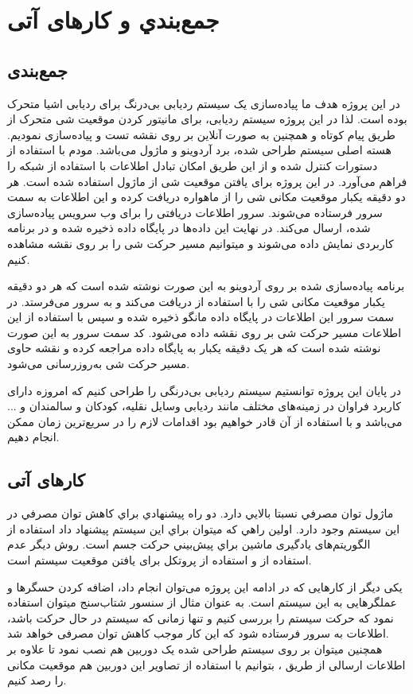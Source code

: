 \chapter{جمع‌بندي و کارهای آتی}
\section{جمع‌بندی}
در این پروژه هدف ما پیاده‌سازی یک سیستم ردیابی بی‌درنگ برای ردیابی اشیا متحرک بوده است.  لذا در این پروژه سیستم ردیابی، برای مانیتور کردن موقعیت شی متحرک از طریق پیام کوتاه و همچنین به صورت آنلاین بر روی نقشه تست و پیاده‌سازی نمودیم. هسته اصلی سیستم طراحی شده، برد آردوینو و ماژول  می‌باشد. مودم  با استفاده از دستورات  کنترل شده و از این طریق امکان تبادل اطلاعات با استفاده از شبکه  را فراهم می‌آورد. در این پروژه برای یافتن موقعیت شی از ماژول  استفاده شده است.  هر دو دقیقه یکبار موقعیت مکانی شی را از ماهواره دریافت کرده و این اطلاعات به سمت سرور فرستاده می‌شوند. سرور اطلاعات دریافتی را برای وب سرویس پیاده‌سازی شده، ارسال می‌کند. در نهایت این داده‌ها در پایگاه داده ذخیره شده و در برنامه کاربردی نمایش داده می‌شوند و میتوانیم مسیر حرکت شی را بر روی نقشه مشاهده کنیم.


برنامه پیاده‌سازی شده بر روی آردوینو به این صورت نوشته شده است که هر دو دقیقه یکبار موقعیت مکانی شی را با استفاده از  دریافت می‌کند و به سرور می‌فرستد. در سمت سرور  این اطلاعات در پایگاه داده مانگو ذخیره شده و سپس با استفاده از این اطلاعات مسیر حرکت شی بر روی نقشه داده می‌شود. کد سمت سرور به این صورت نوشته شده است که هر یک دقیقه یکبار به پایگاه داده مراجعه کرده و نقشه حاوی مسیر حرکت شی به‌روزرسانی می‌شود.


در پایان این پروژه توانستیم سیستم ردیابی بی‌درنگی را  طراحی کنیم که امروزه دارای کاربرد فراوان در زمینه‌های مختلف مانند ردیابی وسایل نقلیه، کودکان و سالمندان و ... می‌باشد و با استفاده از آن قادر خواهیم بود اقدامات لازم را در سریع‌ترین زمان ممکن انجام دهیم.
\section{کارهای آتی}
ماژول  توان مصرفي نسبتا بالايي دارد. دو راه پيشنهادي براي كاهش توان مصرفي در اين سيستم وجود دارد. اولين راهي كه ميتوان براي اين سيستم پيشنهاد داد استفاده از الگوريتم‌های يادگیری ماشین براي پيش‌بيني حركت جسم است. روش ديگر عدم استفاده از  و استفاده از پروتكل  برای یافتن موقعیت سیستم است.


یکی دیگر از کارهایی که در ادامه این پروژه می‌توان انجام داد، اضافه کردن حسگرها و عملگرهایی به این سیستم است. به عنوان مثال از سنسور شتاب‌سنج میتوان استفاده نمود که حرکت سیستم را بررسی کنیم و تنها زمانی که سیستم در حال حرکت باشد، اطلاعات  به سرور فرستاده شود که این کار موجب کاهش توان مصرفی خواهد شد.\\
همچنین میتوان بر روی سیستم طراحی شده یک دوربین هم نصب نمود تا علاوه بر اطلاعات ارسالی از طریق ، بتوانیم با استفاده از تصاویر این دوربین هم موقعیت مکانی  را رصد کنیم.


